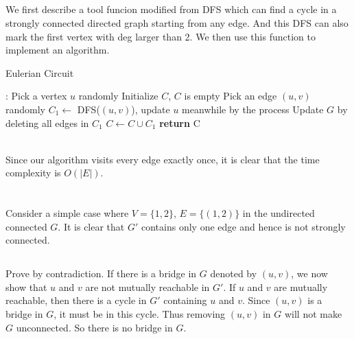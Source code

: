 \documentclass[12pt,letterpaper]{article}
\begin{document}
\subsection{}
We first describe a tool funcion modified from DFS which can find a cycle in a strongly connected directed graph starting from any edge. And this DFS can also mark the first vertex with deg larger than 2. We then use this function to implement an algorithm.
\begin{algorithm}
    \caption{Eulerian Circuit}\label{alg:ec}
    \begin{algorithmic}[1]
    :
    \State Pick a vertex $u$ randomly
    \State Initialize $C$, $C$ is empty
    \State Pick an edge $(u,v)$ randomly 
    \State $C_1\gets$ DFS($(u,v)$), update $u$ meanwhile by the process 
    \State Update $G$ by deleting all edges in $C_1$
    \State $C\gets C\cup C_1$ 
    \EndWhile
    \State \textbf{return} C
    \EndProcedure
    \end{algorithmic}
\end{algorithm}\\
Since our algorithm visits every edge exactly once, it is clear that the time complexity is $O(|E|)$.

\section{}
\subsection{}
Consider a simple case where $V=\{1,2\}$, $E=\{(1,2)\}$ in the undirected connected $G$. It is clear that $G'$ contains only one edge and hence is not strongly connected.
\subsection{}
Prove by contradiction. If there is a bridge in $G$ denoted by $(u,v)$, we now show that $u$ and $v$ are not mutually reachable in $G'$. If $u$ and $v$ are mutually reachable, then there is a cycle in $G'$ containing $u$ and $v$. Since $(u,v)$ is a bridge in $G$, it must be in this cycle. Thus removing $(u,v)$ in $G$ will not make $G$ unconnected. So there is no bridge in $G$.
\end{document}
